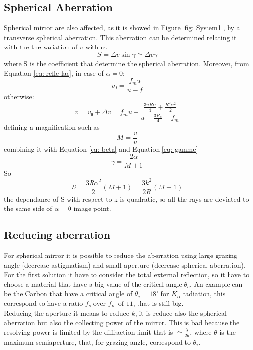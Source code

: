 \subsection{Spherical Aberration}
Spherical mirror are also affected, as it is showed in Figure \ref{fig: System1}, by a transverse spherical aberration. This aberration can be determined relating it with the the variation of $v $ with $\alpha$:
\begin{equation}
S = \Delta v \sin \gamma \simeq \Delta v \gamma
\label{eq: S}
\end{equation}
\noindent where S is the coefficient that determine the spherical aberration. Moreover, from Equation \ref{eq: refle lae}, in case of $\alpha =0 $:
\begin{equation}
v_0 = \frac{f_m u}{u - f}
\label{eq: v0}
\end{equation}
\noindent otherwise:
\begin{equation}
v = v_0 + \Delta v = f_m u - \frac {\frac{3 u R \alpha}{4} + \frac{R^2 \alpha^2}{2}}{u - \frac{3 R_{\alpha}}{4} - f_m}
\label{eq: v}
\end{equation}
\noindent defining a magnification such as
\begin{equation}
M = \frac{v}{u}
\label{eq: M}
\end{equation}
\noindent combining it with Equation \ref{eq: beta} and Equation \ref{eq: gamme}
\begin{equation}
\gamma = \frac{2 \alpha}{M + 1}
\label{eq: new gamme}
\end{equation}
\noindent So
\begin{equation}
S = \frac{3 R \alpha^2}{2} (M + 1) = \frac{3 k^2}{2 R} (M + 1)
\label{eq: new S}
\end{equation}
\noindent the dependance of S with respect to k is quadratic, so all the rays are deviated to the same side of $\alpha = 0$ image point.
\subsection{Reducing aberration}
For spherical mirror it is possible to reduce the aberration using large grazing angle (decrease astigmatism) and small aperture (decrease spherical aberration). For the first solution it have to consider the total external reflection, so it have to choose a material that have a big value of the critical angle $\theta_c $. An example can be the Carbon that have a critical angle of $\theta_c = 18^{\circ} $ for $K_{\alpha} $ radiation, this correspond to have a ratio $f_s $ over $f_m $ of $11 $, that is still big.
\\
Reducing the aperture it means to reduce $k $, it is reduce also the spherical aberration but also the collecting power of the mirror. This is bad because the resolving power is limited by the diffraction limit that is $\simeq \frac{\lambda}{2 \theta} $, where $\theta $ is the maximum semiaperture, that, for grazing angle, correspond to $\theta_i $.

